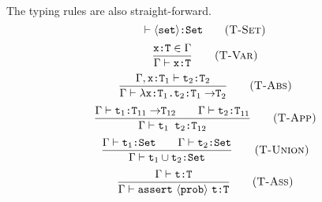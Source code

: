 \documentclass[a4paper]{article}
\begin{document}
\paragraph{}
The typing rules are also straight-forward.
\begin{equation}
	\vdash\langle\text{\tt set}\rangle\text{\tt :Set}
	\tag{\sc T-Set}
\end{equation}
\begin{equation}
	\frac{\text{\tt x:T}\in\Gamma}
	{\Gamma\vdash\text{\tt x:T}}
	\tag{\sc T-Var}
\end{equation}
\begin{equation}
	\frac{\Gamma,\text{\tt x:T}_1\vdash\text{\tt t$_2$:T$_2$}}
	{\Gamma\vdash\lambda\text{\tt x:T$_1$.t$_2$:T$_1\rightarrow$T}_2}
	\tag{\sc T-Abs}
\end{equation}
\begin{equation}
	\frac{\Gamma\vdash\text{\tt t$_1$:T$_{11}\rightarrow$T$_{12}$}\qquad\Gamma\vdash\text{\tt t$_2$:T}_{11}}
	{\Gamma\vdash\text{\tt t$_1$ t$_2$:T}_{12}}
	\tag{\sc T-App}
\end{equation}
\begin{equation}
	\frac{\Gamma\vdash\text{\tt t$_1$:Set}\qquad\Gamma\vdash\text{\tt t$_2$:Set}}
	{\Gamma\vdash\text{\tt t}_1\cup \text{\tt t$_2$:Set}}
	\tag{\sc T-Union}
\end{equation}
\begin{equation}
	\frac{\Gamma\vdash\text{\tt t:T}}
	{\Gamma\vdash\text{\tt assert}\ \langle\text{\tt prob}\rangle\ \text{\tt t:T}}
	\tag{\sc T-Ass}
\end{equation}
\end{document}
